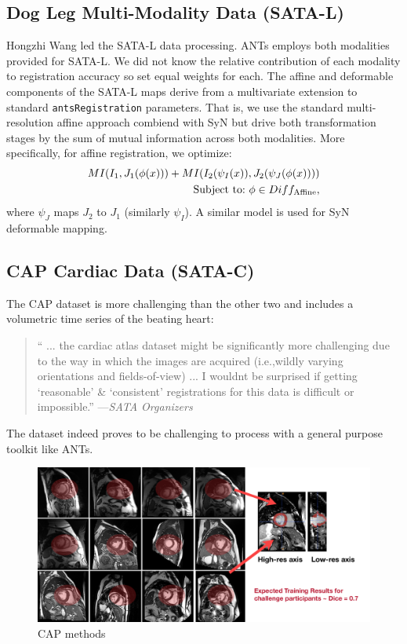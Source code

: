 \documentclass{llncs}
\begin{document}
\subsection{Dog Leg Multi-Modality Data (SATA-L)}
Hongzhi Wang led the SATA-L data processing.  ANTs employs both
modalities provided for SATA-L.  We did not know the relative
contribution of each modality to registration accuracy so set equal weights
for each.   The affine and deformable components of the SATA-L maps
derive from a multivariate extension to standard
\texttt{antsRegistration} parameters.  That is, we use the standard
multi-resolution affine approach combiend with SyN but drive both
transformation stages by the sum of mutual information across both
modalities.  More specifically, for affine registration, we optimize: 
\begin{eqnarray}
MI(  I_1 , J_1( \phi(x) ) ) +
MI(  I_2(\psi_I(x)) , J_2( \psi_J(\phi(x)) ) ) \notag \\ 
\text{Subject to:}~\phi \in Diff_\text{Affine},
\end{eqnarray}
where $\psi_J$ maps $J_2$ to $J_1$ (similarly $\psi_I$).
A similar model is used for SyN deformable mapping. 

\subsection{CAP Cardiac Data (SATA-C)}
The CAP dataset is more challenging than the other two and includes a volumetric time series of the beating heart:

 \begin{quote}
  `` ... the cardiac atlas dataset
  might be significantly more challenging due to the way in which the
  images are acquired (i.e.,wildly varying orientations and
  fields-of-view) ... I wouldnt be surprised if getting `reasonable' \& `consistent' registrations for this data is difficult or impossible.'' ---{\em SATA Organizers}
\end{quote}
 
\noindent The dataset indeed proves to be challenging to process with
a general purpose toolkit like ANTs.  

\begin{figure}[t]
 \centering 
  \includegraphics[width=5in]{../figs/CAP_methods.pdf}
 \caption{CAP methods}
 \label{fig:CAPmethods}
\end{figure}
\end{document}
